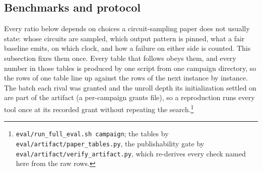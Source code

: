 \subsection{Benchmarks and protocol}
\label{sec:protocol}

Every ratio below depends on choices a circuit-sampling paper does not usually state: whose
circuits are sampled, which output pattern is pinned, what a fair baseline emits, on which
clock, and how a failure on either side is counted. This subsection fixes them once. Every
table that follows obeys them, and every number in those tables is produced by one script
from one campaign directory, so the rows of one table line up against the rows of the next
instance by instance. The batch each rival was granted and the unroll depth its initialization
settled on are part of the artifact (a per-campaign grants file), so a reproduction runs every
tool once at its recorded grant without repeating the search.\footnote{\texttt{eval/run\_full\_eval.sh campaign}; the tables by
\texttt{eval/artifact/paper\_tables.py}, the publishability gate by
\texttt{eval/artifact/verify\_artifact.py}, which re-derives every check named here from the
raw rows.}

